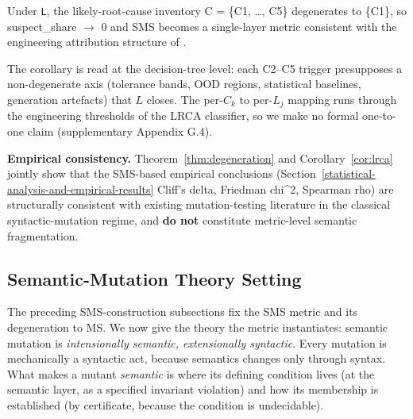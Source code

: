 \documentclass[manuscript,screen,review]{acmart}
\begin{document}
\begin{corollary}\label{cor:lrca}
Under \texttt{L}, the
likely-root-cause inventory C = \{C1, \ldots, C5\} degenerates to
\{C1\}, so suspect\_share $\to$ 0 and SMS becomes a single-layer metric
consistent with the engineering attribution structure of
\citet{d7c38286734419b52de4262c9802ebdfcf4b9447}.
\end{corollary}

The corollary is read at the decision-tree level: each C2--C5 trigger
presupposes a non-degenerate axis (tolerance bands, OOD regions,
statistical baselines, generation artefacts) that $L$ closes. The
per-$C_k$ to per-$L_j$ mapping runs through the engineering thresholds
of the LRCA classifier, so we make no formal one-to-one claim
(supplementary Appendix G.4).

\textbf{Empirical consistency.} Theorem~\ref{thm:degeneration} and
Corollary~\ref{cor:lrca} jointly
show that the SMS-based empirical conclusions (Section~\ref{statistical-analysis-and-empirical-results} Cliff's delta,
Friedman chi\^{}2, Spearman rho) are structurally consistent with
existing mutation-testing literature in the classical syntactic-mutation
regime, and \textbf{do not} constitute metric-level semantic
fragmentation.


\subsection{Semantic-Mutation Theory Setting}\label{theory-setting}

The preceding SMS-construction subsections fix the SMS metric and its degeneration to MS. We now
give the theory the metric instantiates: semantic mutation is
\emph{intensionally semantic, extensionally syntactic}. Every mutation
is mechanically a syntactic act, because semantics changes only through
syntax. What makes a mutant \emph{semantic} is where its defining
condition lives (at the semantic layer, as a specified invariant
violation) and how its membership is established (by certificate,
because the condition is undecidable).
\end{document}
